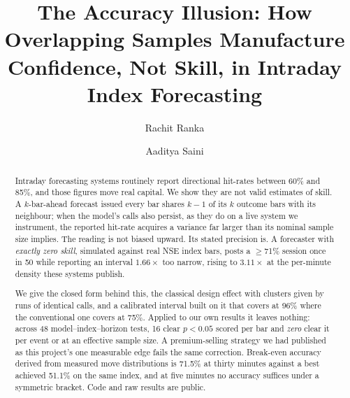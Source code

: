 \documentclass[sigconf,nonacm]{acmart}
\begin{document}
\title{The Accuracy Illusion: How Overlapping Samples Manufacture
Confidence, Not Skill, in Intraday Index Forecasting}

\author{Rachit Ranka}

\author{Aaditya Saini}

\begin{abstract}
Intraday forecasting systems routinely report directional hit-rates between
60\% and 85\%, and those figures move real capital. We show they are not valid
estimates of skill. A $k$-bar-ahead forecast issued every bar shares $k{-}1$ of
its $k$ outcome bars with its neighbour; when the model's calls also persist, as
they do on a live system we instrument, the reported hit-rate acquires a
variance far larger than its nominal sample size implies. The reading is not
biased upward. Its stated precision is. A forecaster with \emph{exactly zero
skill}, simulated against real NSE index bars, posts a $\geq$71\% session once
in 50 while reporting an interval $1.66\times$ too narrow, rising to
$3.11\times$ at the per-minute density these systems publish.

We give the closed form behind this, the classical design effect with clusters
given by runs of identical calls, and a calibrated interval built on it that
covers at 96\% where the conventional one covers at 75\%. Applied to our own
results it leaves nothing: across 48 model--index--horizon tests, 16 clear
$p<0.05$ scored per bar and \emph{zero} clear it per event or at an effective
sample size. A premium-selling strategy we had published as this project's one
measurable edge fails the same correction. Break-even accuracy derived from
measured move distributions is 71.5\% at thirty minutes against a best achieved
51.1\% on the same index, and at five minutes no accuracy suffices under a symmetric bracket. Code
and raw results are public.
\end{abstract}

\end{document}
